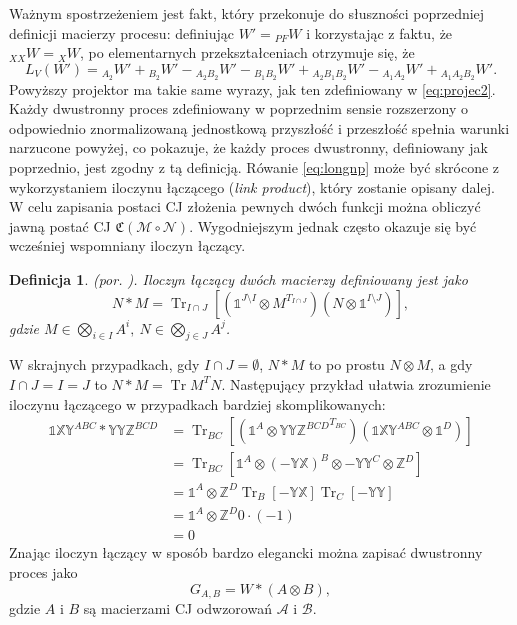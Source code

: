 \documentclass[10pt]{article} %
\newtheorem{definicja}{Definicja}
\DeclareMathOperator{\Trs}{Tr}
\newcommand{\X}{\mathbb{X}}
\newcommand{\Y}{\mathbb{Y}}
\newcommand{\Z}{\mathbb{Z}}
\newcommand{\I}{\mathbb{1}}
\newcommand{\MCJ}{\mathfrak{C}}
\begin{document}
Ważnym spostrzeżeniem jest fakt, który przekonuje do słuszności poprzedniej definicji macierzy procesu: definiując $W' = {}_{PF}W$ i korzystając z faktu, że
${}_{XX}W = {}_{X}W$, po elementarnych przekształceniach otrzymuje się, że
\begin{equation}
\label{nlw}
L_V(W') = {}_{A_2}W' + {}_{B_2}W' - {}_{A_2B_2}W' - {}_{B_1B_2}W' + {}_{A_2B_1B_2}W' - {}_{A_1A_2}W' + {}_{A_1A_2B_2}W'.
\end{equation}
Powyższy projektor ma takie same wyrazy, jak ten zdefiniowany w \eqref{eq:projec2}.
Każdy dwustronny proces zdefiniowany w poprzednim sensie rozszerzony o odpowiednio znormalizowaną jednostkową przyszłość i przeszłość spełnia warunki narzucone powyżej, co pokazuje, że każdy proces dwustronny, definiowany jak poprzednio, jest zgodny z tą definicją.
Rówanie \eqref{eq:longnp} może być skrócone z wykorzystaniem iloczynu łączącego (\textit{link product}), który zostanie opisany dalej.
W celu zapisania postaci CJ złożenia pewnych dwóch funkcji można obliczyć jawną postać CJ $\MCJ(\mathcal{M} \circ \mathcal{N})$. Wygodniejszym
jednak często okazuje się być wcześniej wspomniany iloczyn łączący. 
\begin{definicja}
(por. \cite{purification}).
Iloczyn łączący dwóch macierzy definiowany jest jako
\begin{equation}
N * M = \Trs_{I\cap J}\left[ (\I^{J\setminus I} \otimes M^{T_{I\cap J}})(N \otimes \I^{I\setminus J})\right],
\end{equation}
gdzie $M \in \bigotimes_{i \in I} A^i,~N \in \bigotimes_{j \in J} A^j$.
\end{definicja} W skrajnych przypadkach, gdy $I \cap J = \emptyset$, $N*M$ to po prostu $N \otimes M$, a
gdy $I \cap J = I = J$ to $N * M = \Trs M^T N$. Następujący przykład ułatwia zrozumienie iloczynu łączącego w przypadkach bardziej skomplikowanych:
\begin{equation}
\begin{split}
\I\X\Y^{ABC} * \Y\Y\Z^{BCD} &= \Trs_{BC} \left[ \left(\I^{A} \otimes {\Y\Y\Z^{BCD}}^{T_{BC}}\right)\left(\I\X\Y^{ABC} \otimes \I^D\right)\right] \\
&= \Trs_{BC} \left[ \I^A \otimes (-\Y\X)^{B} \otimes {-\Y\Y}^{C} \otimes \Z^{D}\right] \\
&= \I^{A} \otimes \Z^{D} \Trs_{B} \left[ -\Y\X \right]\Trs_{C}\left[-\Y\Y\right] \\
&= \I^{A} \otimes \Z^{D} 0 \cdot (-1) \\
&= 0
\end{split}
\end{equation}
Znając iloczyn łączący w sposób bardzo elegancki można zapisać dwustronny proces jako
\begin{equation}
G_{A,B} = W * (A \otimes B),
\end{equation} gdzie $A$ i $B$ są macierzami CJ odwzorowań $\mathcal{A}$ i $\mathcal{B}$.
\end{document}

